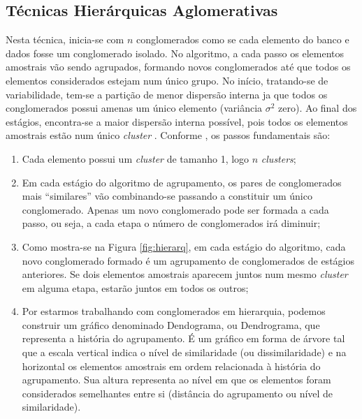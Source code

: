 \documentclass[
]{book}
\begin{document}
\hypertarget{tuxe9cnicas-hieruxe1rquicas-aglomerativas}{%
\subsection{Técnicas Hierárquicas Aglomerativas}\label{tuxe9cnicas-hieruxe1rquicas-aglomerativas}}

Nesta técnica, inicia-se com \(n\) conglomerados como se cada elemento do banco e dados fosse um conglomerado isolado. No algoritmo, a cada passo os elementos amostrais vão sendo agrupados, formando novos conglomerados até que todos os elementos considerados estejam num único grupo. No início, tratando-se de variabilidade, tem-se a partição de menor dispersão interna ja que todos os conglomerados possui amenas um único elemento (variância \(\sigma^2\) zero). Ao final dos estágios, encontra-se a maior dispersão interna possível, pois todos os elementos amostrais estão num único \emph{cluster} \citep{mingoti2007analise}. Conforme \citet{mingoti2007analise}, os passos fundamentais são:

\begin{enumerate}
\def\labelenumi{\arabic{enumi}.}
\item
  Cada elemento possui um \emph{cluster} de tamanho 1, logo \(n\) \emph{clusters};
\item
  Em cada estágio do algoritmo de agrupamento, os pares de conglomerados mais ``similares'' vão combinando-se passando a constituir um único conglomerado. Apenas um novo conglomerado pode ser formada a cada passo, ou seja, a cada etapa o número de conglomerados irá diminuir;
\item
  Como mostra-se na Figura \ref{fig:hierarq}, em cada estágio do algoritmo, cada novo conglomerado formado é um agrupamento de conglomerados de estágios anteriores. Se dois elementos amostrais aparecem juntos num mesmo \emph{cluster} em alguma etapa, estarão juntos em todos os outros;
\item
  Por estarmos trabalhando com conglomerados em hierarquia, podemos construir um gráfico denominado Dendograma, ou Dendrograma, que representa a história do agrupamento. É um gráfico em forma de árvore tal que a escala vertical indica o nível de similaridade (ou dissimilaridade) e na horizontal os elementos amostrais em ordem relacionada à história do agrupamento. Sua altura representa ao nível em que os elementos foram considerados semelhantes entre si (distância do agrupamento ou nível de similaridade).
\end{enumerate}
\end{document}
